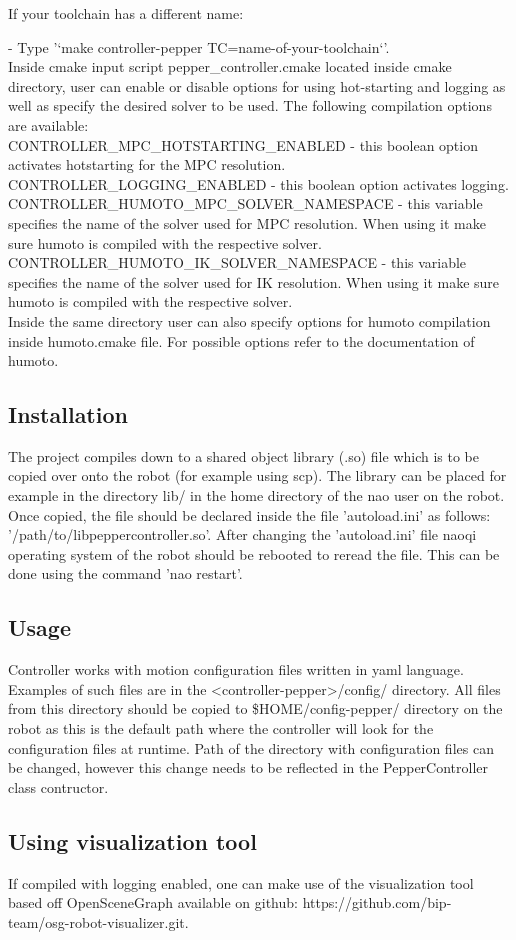 \noindent If your toolchain has a different name:

- Type '`make controller-pepper TC=name-of-your-toolchain`'.\\

\noindent Inside cmake input script pepper\_controller.cmake located inside cmake directory, user can enable or disable
options for using hot-starting and logging as well as specify the desired solver to be used. The following compilation
options are available:\\

\noindent CONTROLLER\_MPC\_HOTSTARTING\_ENABLED - this boolean option activates hotstarting for the MPC resolution.\\
\noindent CONTROLLER\_LOGGING\_ENABLED - this boolean option activates logging.\\
\noindent CONTROLLER\_HUMOTO\_MPC\_SOLVER\_NAMESPACE - this variable specifies the name of the solver used for MPC resolution. 
When using it make sure humoto is compiled with the respective solver.\\
\noindent CONTROLLER\_HUMOTO\_IK\_SOLVER\_NAMESPACE - this variable specifies the name of the solver used for IK resolution. 
When using it make sure humoto is compiled with the respective solver.\\

\noindent Inside the same directory user can also specify options for humoto compilation inside humoto.cmake file.
For possible options refer to the documentation of humoto.

\subsection{Installation}
\noindent The project compiles down to a shared object library (.so) file which is to be copied over onto the robot (for example
using scp). The library can be placed for example in the directory lib/ in the home directory of the nao user on the
robot. Once copied, the file should be declared inside the file 'autoload.ini' as follows:
'/path/to/libpeppercontroller.so'. After changing the 'autoload.ini' file naoqi operating system of the robot should be
rebooted to reread the file. This can be done using the command 'nao restart'.

\subsection{Usage}
Controller works with motion configuration files written in yaml language. Examples of such files are in the
<controller-pepper>/config/ directory. All files from this directory should be copied to \$HOME/config-pepper/ 
directory on the robot as this is the default path where the controller will look for the configuration files 
at runtime. Path of the directory with configuration files can be changed, however this change needs to be reflected in
the PepperController class contructor.

\subsection{Using visualization tool}
\noindent If compiled with logging enabled, one can make use of the visualization tool based off OpenSceneGraph
available on github: https://github.com/bip-team/osg-robot-visualizer.git.
